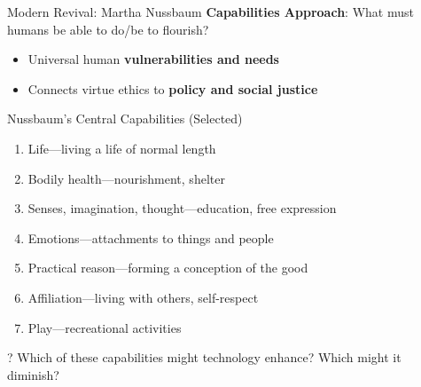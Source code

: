 \documentclass[aspectratio=169]{beamer}
\begin{document}
\begin{frame}{Modern Revival: Martha Nussbaum}
\textbf{Capabilities Approach}: What must humans be able to do/be to flourish?

\begin{itemize}
    \item Universal human \textbf{vulnerabilities and needs}
    \item Connects virtue ethics to \textbf{policy and social justice}
\end{itemize}

\vspace{0.2cm}
\begin{block}{Nussbaum's Central Capabilities (Selected)}
\footnotesize
\begin{enumerate}
    \item Life---living a life of normal length
    \item Bodily health---nourishment, shelter
    \item Senses, imagination, thought---education, free expression
    \item Emotions---attachments to things and people
    \item Practical reason---forming a conception of the good
    \item Affiliation---living with others, self-respect
    \item Play---recreational activities
\end{enumerate}
\end{block}

\begin{alertblock}{?}
Which of these capabilities might technology enhance? Which might it diminish?
\end{alertblock}
\end{frame}
\end{document}
